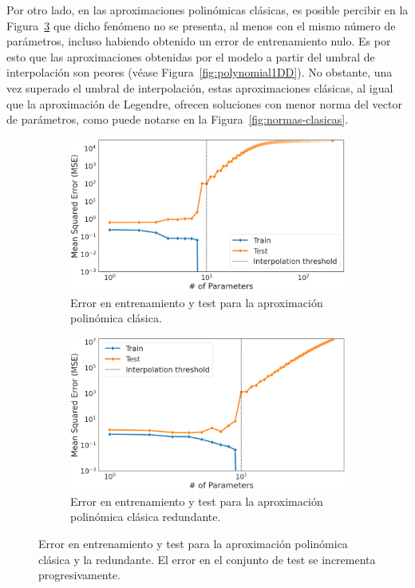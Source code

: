Por otro lado, en las aproximaciones polinómicas clásicas, es posible percibir en la Figura~\ref{fig:aproximaciones-polinomicas} que dicho fenómeno no se presenta, al menos con el mismo número de parámetros, incluso habiendo obtenido un error de entrenamiento nulo. Es por esto que las aproximaciones obtenidas por el modelo a partir del umbral de interpolación son peores (véase Figura~\ref{fig:polynomial1DD}). No obstante, una vez superado el umbral de interpolación, estas aproximaciones clásicas, al igual que la aproximación de Legendre, ofrecen soluciones con menor norma del vector de parámetros, como puede notarse en la Figura~\ref{fig:normas-clasicas}.

\begin{figure}[h]
    \centering
    \begin{subfigure}[b]{0.48\textwidth}
        \centering
        \includegraphics[width=\textwidth]{img/experiments/OLS1DDD.png}
        \caption{Error en entrenamiento y test para la aproximación polinómica clásica.}\label{fig:OLS1DDD}
    \end{subfigure}
    \hfill
    \begin{subfigure}[b]{0.48\textwidth}
        \centering
        \includegraphics[width=\textwidth]{img/experiments/Redundant1DDD.png}
        \caption{Error en entrenamiento y test para la aproximación polinómica clásica redundante.}\label{fig:Redundant1DDD}
    \end{subfigure}
    \caption[Error en entrenamiento y test para las distintas aproximaciones polinómicas.]{Error en entrenamiento y test para la aproximación polinómica clásica y la redundante. El error en el conjunto de test se incrementa progresivamente.}\label{fig:aproximaciones-polinomicas}
\end{figure}

